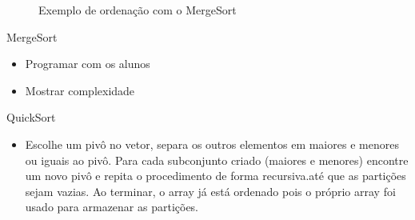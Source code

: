 \begin{frame}{}
	\begin{figure}[h!]
		\centering    
		  \caption{Exemplo de ordenação com o MergeSort}
	 \end{figure} 
\end{frame}

\begin{frame}
	\begin{block}{MergeSort}
		\begin{itemize}
			\item Programar com os alunos
			\item Mostrar complexidade
		\end{itemize}
	\end{block}
\end{frame}


\begin{frame}
	\begin{block}{QuickSort}
		\begin{itemize}
			\item Escolhe um pivô no vetor, separa os outros elementos em maiores e menores ou iguais ao pivô. Para cada subconjunto criado (maiores e menores) encontre um novo pivô e repita o procedimento de forma recursiva.até que as partições sejam vazias. Ao terminar, o array já está ordenado pois o próprio array foi usado para armazenar as partições.
		\end{itemize}
	\end{block}
\end{frame}


